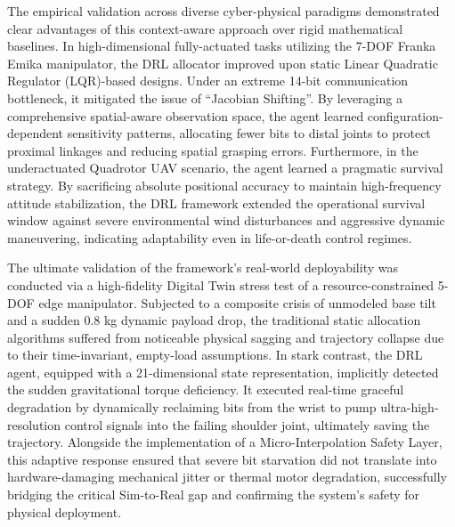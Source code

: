 The empirical validation across diverse cyber-physical paradigms demonstrated clear advantages of this context-aware approach over rigid mathematical baselines. 
In high-dimensional fully-actuated tasks utilizing the 7-DOF Franka Emika manipulator, the DRL allocator improved upon static Linear Quadratic Regulator (LQR)-based designs. 
Under an extreme 14-bit communication bottleneck, it mitigated the issue of ``Jacobian Shifting''. 
By leveraging a comprehensive spatial-aware observation space, the agent learned configuration-dependent sensitivity patterns, allocating fewer bits to distal joints to protect proximal linkages and reducing spatial grasping errors. 
Furthermore, in the underactuated Quadrotor UAV scenario, the agent learned a pragmatic survival strategy. By sacrificing absolute positional accuracy to maintain high-frequency attitude stabilization, the DRL framework extended the operational survival window against severe environmental wind disturbances and aggressive dynamic maneuvering, indicating adaptability even in life-or-death control regimes.

The ultimate validation of the framework's real-world deployability was conducted via a high-fidelity Digital Twin stress test of a resource-constrained 5-DOF edge manipulator. 
Subjected to a composite crisis of unmodeled base tilt and a sudden 0.8 kg dynamic payload drop, the traditional static allocation algorithms suffered from noticeable physical sagging and trajectory collapse due to their time-invariant, empty-load assumptions. 
In stark contrast, the DRL agent, equipped with a 21-dimensional state representation, implicitly detected the sudden gravitational torque deficiency. It executed real-time graceful degradation by dynamically reclaiming bits from the wrist to pump ultra-high-resolution control signals into the failing shoulder joint, ultimately saving the trajectory. 
Alongside the implementation of a Micro-Interpolation Safety Layer, this adaptive response ensured that severe bit starvation did not translate into hardware-damaging mechanical jitter or thermal motor degradation, successfully bridging the critical Sim-to-Real gap and confirming the system's safety for physical deployment.

